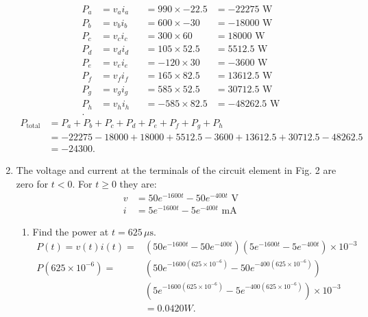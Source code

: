 \documentclass{zc-ust-hw}
\begin{document}
\begin{enumerate}
    \begin{align}
      P_{a} &= v_{a}i_{a} &&= 990 \times -22.5 &= -22275 \text{ W} \\
      P_{b} &= v_{b}i_{b} &&= 600 \times -30   &= -18000 \text{ W} \\
      P_{c} &= v_{c}i_{c} &&= 300 \times 60    &= 18000 \text{ W} \\
      P_{d} &= v_{d}i_{d} &&= 105 \times 52.5  &= 5512.5 \text{ W} \\
      P_{e} &= v_{e}i_{e} &&= -120 \times 30   &= -3600 \text{ W} \\
      P_{f} &= v_{f}i_{f} &&= 165 \times 82.5  &= 13612.5 \text{ W} \\
      P_{g} &= v_{g}i_{g} &&= 585 \times 52.5  &= 30712.5 \text{ W} \\
      P_{h} &= v_{h}i_{h} &&= -585 \times 82.5 &= -48262.5 \text{ W} \\
    .\end{align}
    \begin{align}
      P_{\text{total}} &= P_{a} + P_{b} + P_{c} + P_{d} + P_{e} + P_{f} + P_{g} + P_{h} \\
                       &= -22275 - 18000 + 18000 + 5512.5 - 3600 + 13612.5 + 30712.5 - 48262.5 \\
                       &= -24300
    .\end{align}

    \begin{center}
    \end{center}

    \newpage

  \item The voltage and current at the terminals of the circuit element in Fig.
    2 are zero for $t < 0$. For $t \ge 0$ they are:
    \begin{align*}
      v &= 50e^{-1600t}-50e^{-400t} \text{ V} \\
      i &= 5e^{-1600t}-5e^{-400t} \text{ mA}
    \end{align*}
    \begin{enumerate}
      \item Find the power at $t=625 \,\mu\text{s}$.
        \begin{align}
          P(t) = v(t)i(t) =& (50e^{-1600t}-50e^{-400t})(5e^{-1600t}-5e^{-400t}) \times 10^{-3} \\
          P(625\times 10^{-6}) =&
                                \left( 
                                50e^{-1600(625\times 10^{-6})}-50e^{-400(625\times 10^{-6})}
                              \right)  \\
                                &\left( 
            5e^{-1600(625\times 10^{-6})}-5e^{-400(625\times 10^{-6})}
          \right) 
          \times 10^{-3} \\
                                &= 0.0420{ W}
        .\end{align}
        

\end{enumerate}
\end{enumerate}
\end{document}
